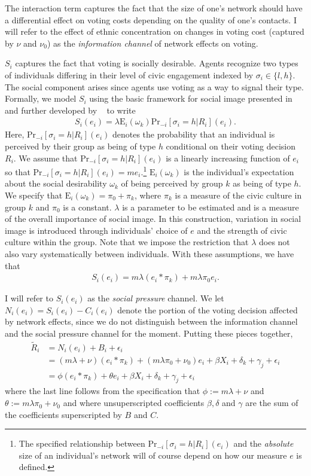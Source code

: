\documentclass[11pt, oneside]{article}   	%
\newcommand{\eqs}[1]{\begin{align*}#1\end{align*}}
\newcommand{\E}{\mathrm{E}}
\begin{document}
The interaction term captures the fact that the size of one's network should have a differential effect on voting costs depending on the quality of one's contacts. I will refer to the effect of ethnic concentration on changes in voting cost (captured by $\nu$ and $\nu_0$) as the \emph{information channel} of network effects on voting.

$S_i$ captures the fact that voting is socially desirable. Agents recognize two types of individuals differing in their level of civic engagement indexed by $\sigma_i \in \{l, h\}$. The social component arises since agents use voting as a way to signal their type. Formally, we model $S_i$ using the basic framework for social image presented in ~\cite{Benabou2006} and further developed by ~\cite{Bursztyn2017} to write
\eqs{
	S_i(e_i) = \lambda \E_i(\omega_k)\mathrm{Pr}_{-i}[\sigma_i = h | R_i](e_i).
}
Here, $\mathrm{Pr}_{-i}[\sigma_i = h | R_i](e_i)$ denotes the probability that an individual is perceived by their group as being of type $h$ conditional on their voting decision $R_i$. We assume that $\mathrm{Pr}_{-i}[\sigma_i = h | R_i](e_i)$ is a linearly increasing function of $e_i$ so that $\mathrm{Pr}_{-i}[\sigma_i = h | R_i](e_i)=me_i$.\footnote{The specified relationship between $\mathrm{Pr}_{-i}[\sigma_i = h | R_i](e_i)$ and the \emph{absolute} size of an individual's network will of course depend on how our measure $e$ is defined.} $\E_i(\omega_k)$ is the individual's expectation about the social desirability $\omega_k$ of being perceived by group $k$ as being of type $h$. We specify that $\E_i(\omega_k)=\pi_0 + \pi_k$, where $\pi_k$ is a measure of the civic culture in group $k$ and $\pi_0$ is a constant. $\lambda$ is a parameter to be estimated and is a measure of the overall importance of social image. In this construction, variation in social image is introduced through individuals' choice of $e$ and the strength of civic culture within the group. Note that we impose the restriction that $\lambda$ does not also vary systematically between individuals. With these assumptions, we have that
\eqs{
	S_i(e_i) = m\lambda (e_i * \pi_k) + m\lambda\pi_0 e_i.
}

I will refer to $S_i(e_i)$ as the \emph{social pressure} channel. We let $N_i(e_i)=S_i(e_i)-C_i(e_i)$ denote the portion of the voting decision affected by network effects, since we do not distinguish between the information channel and the social pressure channel for the moment. Putting these pieces together,
\eqs{
	\tilde R_i &= N_i(e_i) + B_i +\epsilon_i \\
	&= (m\lambda + \nu) (e_i * \pi_k) + (m\lambda\pi_0 + \nu_0) e_i + \beta X_i + \delta_k + \gamma_j + \epsilon_i \\
	&= \phi (e_i * \pi_k) + \theta e_i + \beta X_i + \delta_k + \gamma_j + \epsilon_i
}
where the last line follows from the specification that $\phi := m\lambda + \nu$ and $\theta :=m\lambda\pi_0 + \nu_0$ and where unsuperscripted coefficients $\beta, \delta$ and $\gamma$ are the sum of the coefficients superscripted by $B$ and $C$. 
\end{document}
